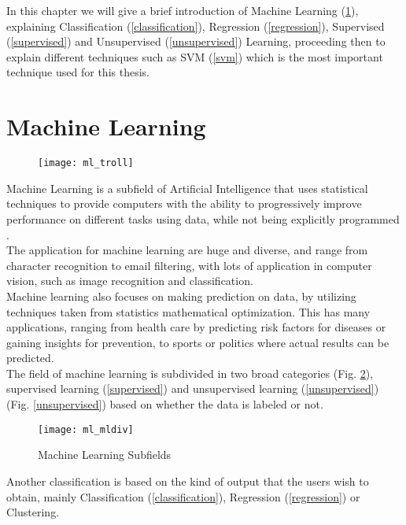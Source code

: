 In this chapter we will give a brief introduction of Machine Learning (\ref{ml}), explaining Classification (\ref{classification}), Regression (\ref{regression}), Supervised (\ref{supervised}) and Unsupervised (\ref{unsupervised}) Learning, 
proceeding then to explain different techniques such as SVM (\ref{svm}) which is the most important technique used for this thesis.

\section{Machine Learning} \label{ml}
\begin{figure}[H]
	\centering
	\texttt{[image: ml\_troll]}
	\label{fig:ml_troll}
\end{figure}
Machine Learning is a subfield of Artificial Intelligence that uses statistical techniques to provide computers with the ability to progressively improve performance on different tasks using data, while not being explicitly programmed \cite{wiki:ml}. \\

The application for machine learning are huge and diverse, and range from character recognition to email filtering, with lots of application in computer vision, such as image recognition and classification. \\

Machine learning also focuses on making prediction on data, by utilizing techniques taken from statistics  mathematical optimization. This has many applications, ranging from health care by predicting risk factors for diseases or gaining insights for prevention, to sports or politics where actual results can be predicted.\\

The field of machine learning is subdivided in two broad categories (Fig. \ref{fig:ml_mldiv}), supervised learning (\ref{supervised}) and unsupervised learning (\ref{unsupervised}) (Fig. \ref{unsupervised}) based on whether the data is labeled or not.\\

\begin{figure}[H]
	\centering
	\texttt{[image: ml\_mldiv]}
	\caption{Machine Learning Subfields \cite{ml_mldiv}}
	\label{fig:ml_mldiv}
\end{figure}

Another classification is based on the kind of output that the users wish to obtain, mainly Classification (\ref{classification}), Regression (\ref{regression}) or Clustering.

